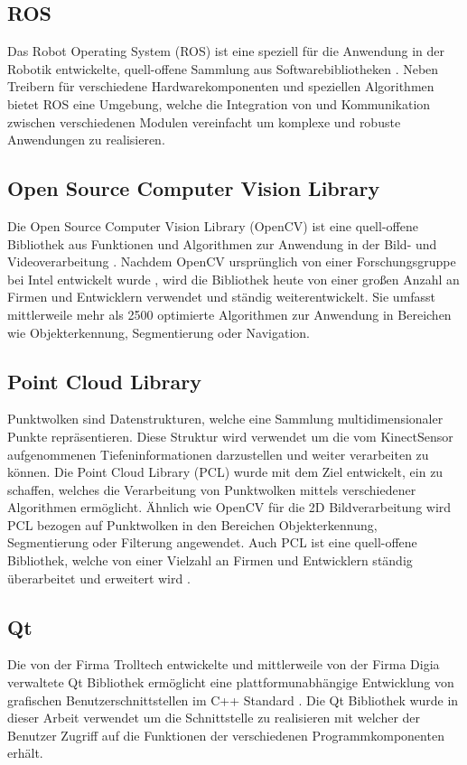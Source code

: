 \subsection{ROS}
\label{chap:ros}
Das Robot Operating System (ROS) ist eine speziell für die Anwendung in der Robotik entwickelte, quell-offene Sammlung aus Softwarebibliotheken \cite{ROS}. Neben Treibern für verschiedene Hardwarekomponenten und speziellen Algorithmen bietet ROS eine Umgebung, welche die Integration von und Kommunikation zwischen verschiedenen Modulen vereinfacht um komplexe und robuste Anwendungen zu realisieren. 

\subsection{Open Source Computer Vision Library}
Die Open Source Computer Vision Library (OpenCV) ist eine quell-offene Bibliothek aus Funktionen und Algorithmen zur Anwendung in der Bild- und Videoverarbeitung \cite{OpenCV}. Nachdem OpenCV ursprünglich von einer Forschungsgruppe bei Intel entwickelt wurde \cite{Laganiere2011}, wird die Bibliothek heute von einer großen Anzahl an Firmen und Entwicklern verwendet und ständig weiterentwickelt. Sie umfasst mittlerweile mehr als 2500 optimierte Algorithmen zur Anwendung in Bereichen wie Objekterkennung, Segmentierung oder Navigation.

\subsection{Point Cloud Library}
Punktwolken sind Datenstrukturen, welche eine Sammlung multidimensionaler Punkte repräsentieren. Diese Struktur wird verwendet um die vom Kinect\red[TM] Sensor aufgenommenen Tiefeninformationen darzustellen und weiter verarbeiten zu können. Die Point Cloud Library (PCL) wurde mit dem Ziel entwickelt, ein \red[Rahmenwerk] zu schaffen, welches die Verarbeitung von Punktwolken mittels verschiedener Algorithmen ermöglicht. Ähnlich wie OpenCV für die 2D Bildverarbeitung wird PCL bezogen auf Punktwolken in den Bereichen Objekterkennung, Segmentierung oder Filterung angewendet. Auch PCL ist eine quell-offene Bibliothek, welche von einer Vielzahl an Firmen und Entwicklern ständig überarbeitet und erweitert wird \cite{PCL}.

\subsection{Qt}
Die von der Firma Trolltech entwickelte und mittlerweile von der Firma Digia verwaltete Qt Bibliothek ermöglicht eine plattformunabhängige Entwicklung von grafischen Benutzerschnittstellen im C++ Standard \cite{Qt}. Die Qt Bibliothek wurde in dieser Arbeit verwendet um die Schnittstelle zu realisieren mit welcher der Benutzer Zugriff auf die Funktionen der verschiedenen Programmkomponenten erhält.

